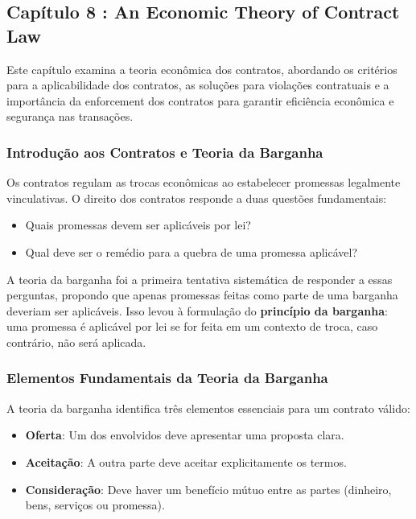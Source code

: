 \documentclass[a4paper,12pt]{article}[abntex2]
\begin{document}
\subsection{\textbf{Capítulo 8 : An Economic Theory of Contract Law}}

Este capítulo examina a teoria econômica dos contratos, abordando os critérios para a aplicabilidade dos contratos, as soluções para violações contratuais e a importância da enforcement dos contratos para garantir eficiência econômica e segurança nas transações.

\subsubsection{Introdução aos Contratos e Teoria da Barganha}

Os contratos regulam as trocas econômicas ao estabelecer promessas legalmente vinculativas. O direito dos contratos responde a duas questões fundamentais:
\begin{itemize}
    \item Quais promessas devem ser aplicáveis por lei?
    \item Qual deve ser o remédio para a quebra de uma promessa aplicável?
\end{itemize}

A teoria da barganha foi a primeira tentativa sistemática de responder a essas perguntas, propondo que apenas promessas feitas como parte de uma barganha deveriam ser aplicáveis. Isso levou à formulação do \textbf{princípio da barganha}: uma promessa é aplicável por lei se for feita em um contexto de troca, caso contrário, não será aplicada.

\subsubsection{Elementos Fundamentais da Teoria da Barganha}

A teoria da barganha identifica três elementos essenciais para um contrato válido:
\begin{itemize}
    \item \textbf{Oferta}: Um dos envolvidos deve apresentar uma proposta clara.
    \item \textbf{Aceitação}: A outra parte deve aceitar explicitamente os termos.
    \item \textbf{Consideração}: Deve haver um benefício mútuo entre as partes (dinheiro, bens, serviços ou promessa).
\end{itemize}
\end{document}
